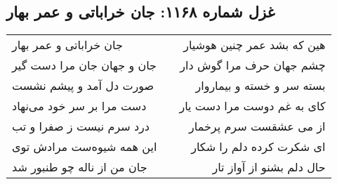 \begin{center}
\section*{غزل شماره ۱۱۶۸: جان خراباتی و عمر بهار}
\label{sec:1168}
\begin{longtable}{l p{0.5cm} r}
جان خراباتی و عمر بهار
&&
هین که بشد عمر چنین هوشیار
\\
جان و جهان جان مرا دست گیر
&&
چشم جهان حرف مرا گوش دار
\\
صورت دل آمد و پیشم نشست
&&
بسته سر و خسته و بیماروار
\\
دست مرا بر سر خود می‌نهاد
&&
کای به غم دوست مرا دست یار
\\
درد سرم نیست ز صفرا و تب
&&
از می عشقست سرم پرخمار
\\
این همه شیوه‌ست مرادش توی
&&
ای شکرت کرده دلم را شکار
\\
جان من از ناله چو طنبور شد
&&
حال دلم بشنو از آواز تار
\\
\end{longtable}
\end{center}
